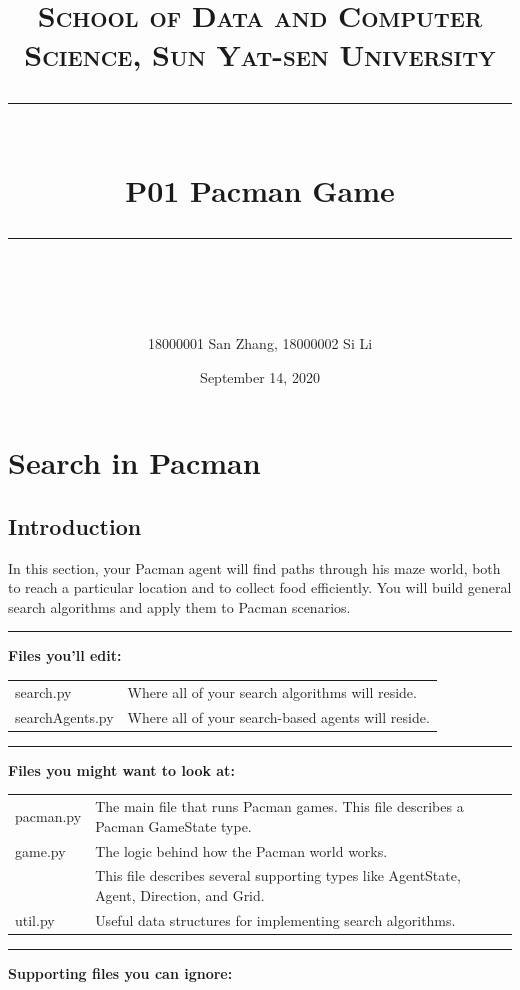 \documentclass[a4paper, 11pt]{article}
\title{	
\normalfont \normalsize
\textsc{School of Data and Computer Science, Sun Yat-sen University} \\ [25pt] %
\rule{\textwidth}{0.5pt} \\[0.4cm] %
\huge  P01 Pacman Game \\ %
\rule{\textwidth}{2pt} \\[0.5cm] %
\author{18000001 San Zhang, 18000002 Si Li}
\date{\normalsize September 14, 2020}
}
\begin{document}
\maketitle
\tableofcontents
\newpage
\section{Search in Pacman}
\subsection{Introduction}
In this section, your Pacman agent will find paths through his maze world, both to reach a particular location and to collect food efficiently. You will build general search algorithms and apply them to Pacman scenarios.

\rule{\textwidth}{0.5pt}

\textbf{Files you'll edit:}

\begin{tabular}{ll}
  \textsf{search.py} &  Where all of your search algorithms will reside.\\
  \textsf{searchAgents.py} & Where all of your search-based agents will reside.
\end{tabular}

\rule{\textwidth}{0.5pt}

\textbf{Files you might want to look at:}

\begin{tabular}{ll}
  \textsf{pacman.py} & The main file that runs Pacman games. This file describes a Pacman GameState type.\\
  \textsf{game.py} &	The logic behind how the Pacman world works.\\
  & This file describes several supporting types like AgentState, Agent, Direction, and Grid.\\
  \textsf{util.py} &	Useful data structures for implementing search algorithms.
\end{tabular}

\rule{\textwidth}{0.5pt}

\textbf{Supporting files you can ignore:}
\end{document}
